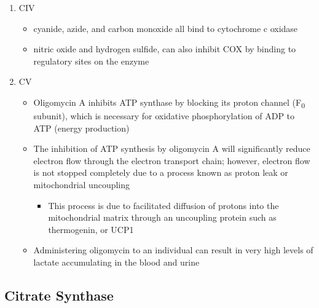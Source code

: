 \documentclass{scrartcl}
\begin{document}
\begin{enumerate}
\begin{enumerate}
\item CIV
\label{sec:orgdfbcc1b}
\begin{itemize}
\item cyanide, azide, and carbon monoxide all bind to cytochrome c
oxidase
\item nitric oxide and hydrogen sulfide, can also inhibit COX by
binding to regulatory sites on the enzyme
\end{itemize}
\item CV
\label{sec:orgef6ec71}
\begin{itemize}
\item Oligomycin A inhibits ATP synthase by blocking its proton channel
(F\textsubscript{0} subunit), which is necessary for oxidative phosphorylation of
ADP to ATP (energy production)
\item The inhibition of ATP synthesis by oligomycin A will significantly
reduce electron flow through the electron transport chain; however,
electron flow is not stopped completely due to a process known as
proton leak or mitochondrial uncoupling
\begin{itemize}
\item This process is due to facilitated diffusion of protons into the
mitochondrial matrix through an uncoupling protein such as
thermogenin, or UCP1
\end{itemize}

\item Administering oligomycin to an individual can result in very high
levels of lactate accumulating in the blood and urine
\end{itemize}
\end{enumerate}
\end{enumerate}

\subsection{Citrate Synthase}
\label{sec:org12e8206}
\end{document}
